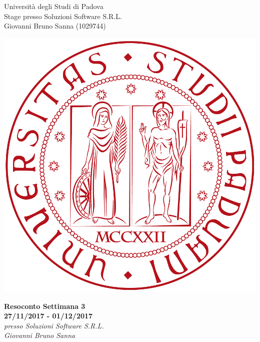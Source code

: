 \documentclass[11pt,notitlepage]{article}
\makeatletter
\newcommand{\nomeStudente}{Giovanni Bruno}
\newcommand{\cognomeStudente}{Sanna}
\newcommand{\matricolaStudente}{1029744}
\newcommand{\emailStudente}{giovannibruno.sanna@studenti.unipd.com}
\newcommand{\telStudente}{+39 0000000000}
\newcommand{\nomeTutorAziendale}{Nome}
\newcommand{\cognomeTutorAziendale}{Cognome}
\newcommand{\emailTutorAziendale}{xxtutor@azienda.it}
\newcommand{\telTutorAziendale}{+39 0000000000}
\newcommand{\ragioneSocAzienda}{Soluzioni Software S.R.L.}
\newcommand{\indirizzoAzienda}{Via Via dei Ronchi, 21, 35127 Padova (PD)}
\newcommand{\sitoAzienda}{http://www.soluzioni-sw.it/}
\makeatother
\begin{document}
	
\noindent
\parbox{0.7\columnwidth}{Università degli Studi di Padova\\
	Stage presso \ragioneSocAzienda{}\\
	\nomeStudente{} \cognomeStudente{} (\matricolaStudente{})}%
\parbox{0.3\columnwidth}{
	\hfill \includegraphics[scale=0.08]{immagini/logo-unipd.png}}

\bigskip
\begin{center}
{\Huge \textbf{Resoconto Settimana 3}} \\ 
{\textbf{27/11/2017 - 01/12/2017}} \\ \bigskip
	{\Large \textit{presso \ragioneSocAzienda{}}}\\ \bigskip
	{\Large \textit{\nomeStudente{} \cognomeStudente{}}}
\end{center}

\end{document}

